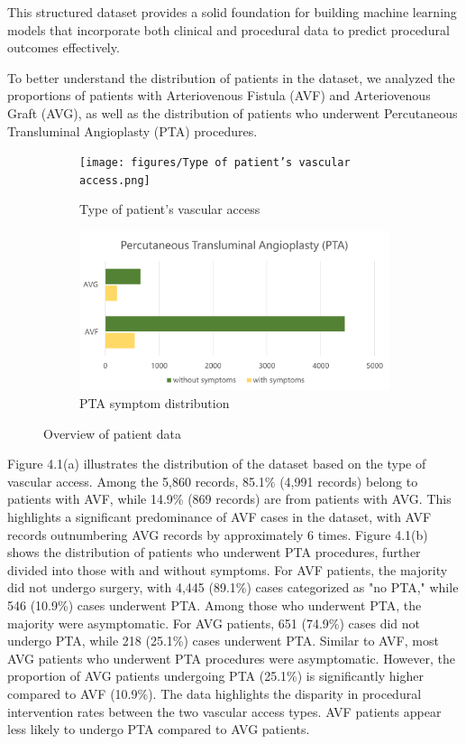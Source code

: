 This structured dataset provides a solid foundation for building machine learning models that incorporate both clinical and procedural data to predict procedural outcomes effectively.

To better understand the distribution of patients in the dataset, we analyzed the proportions of patients with Arteriovenous Fistula (AVF) and Arteriovenous Graft (AVG), as well as the distribution of patients who underwent Percutaneous Transluminal Angioplasty (PTA) procedures.

\begin{figure}[H]
    \centering
    \begin{subfigure}[b]{0.4\textwidth}
        \centering
        \texttt{[image: figures/Type of patient’s vascular access.png]}
        \caption{Type of patient’s vascular access}
        \label{fig:vascular-access}
    \end{subfigure}%
    \hfill
    \begin{subfigure}[b]{0.6\textwidth}
        \centering
        \includegraphics[width=\linewidth]{figures/PTA symptom distribution.png}
        \caption{PTA symptom distribution}
        \label{fig:pta-symptom}
    \end{subfigure}
    \caption{Overview of patient data}
    \label{fig:combined}
\end{figure}

Figure 4.1(a) illustrates the distribution of the dataset based on the type of vascular access. Among the 5,860 records, 85.1\% (4,991 records) belong to patients with AVF, while 14.9\% (869 records) are from patients with AVG. This highlights a significant predominance of AVF cases in the dataset, with AVF records outnumbering AVG records by approximately 6 times. Figure 4.1(b) shows the distribution of patients who underwent PTA procedures, further divided into those with and without symptoms. For AVF patients, the majority did not undergo surgery, with 4,445 (89.1\%) cases categorized as "no PTA," while 546 (10.9\%) cases underwent PTA. Among those who underwent PTA, the majority were asymptomatic. For AVG patients, 651 (74.9\%) cases did not undergo PTA, while 218 (25.1\%) cases underwent PTA. Similar to AVF, most AVG patients who underwent PTA procedures were asymptomatic. However, the proportion of AVG patients undergoing PTA (25.1\%) is significantly higher compared to AVF (10.9\%). The data highlights the disparity in procedural intervention rates between the two vascular access types. AVF patients appear less likely to undergo PTA compared to AVG patients. 

